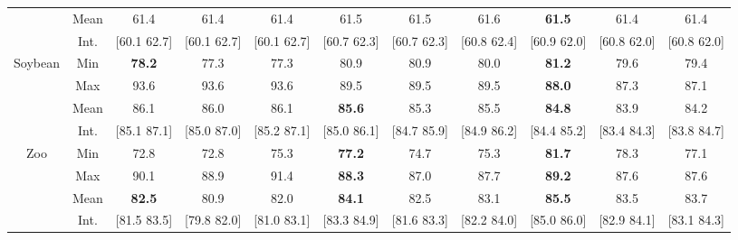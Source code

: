 \documentclass[10pt]{article}
\begin{document}
\begin{table*}
{\begin{tabular}{|c|c|ccc|ccc|ccc|}
\\
&Mean
 &61.4 &61.4 &61.4  %
 &61.5 &61.5 &61.6  %
 &{\bfseries 61.5} &61.4 &61.4  %
\\
&Int.
 &[60.1 62.7] &[60.1 62.7] &[60.1 62.7]  %
 &[60.7 62.3] &[60.7 62.3] &[60.8 62.4]  %
 &[60.9 62.0] &[60.8 62.0] &[60.8 62.0]  %
\\
\cline{1-11}
\multirow{4}{1.6cm}{Soybean}
&Min
 &{\bfseries 78.2} &77.3 &77.3  %
 &80.9 &80.9 &80.0  %
 &{\bfseries 81.2} &79.6 &79.4  %
\\
&Max
 &93.6 &93.6 &93.6  %
 &89.5 &89.5 &89.5  %
 &{\bfseries 88.0} &87.3 &87.1  %
\\
&Mean
 &86.1 &86.0 &86.1  %
 &{\bfseries 85.6} &85.3 &85.5  %
 &{\bfseries 84.8} &83.9 &84.2  %
\\
&Int.
 &[85.1 87.1] &[85.0 87.0] &[85.2 87.1]  %
 &[85.0 86.1] &[84.7 85.9] &[84.9 86.2]  %
 &[84.4 85.2] &[83.4 84.3] &[83.8 84.7]  %
\\
\cline{1-11}
\multirow{4}{1.6cm}{Zoo}
&Min
 &72.8 &72.8 &75.3  %
 &{\bfseries 77.2} &74.7 &75.3  %
 &{\bfseries 81.7} &78.3 &77.1  %
\\
&Max
 &90.1 &88.9 &91.4  %
 &{\bfseries 88.3} &87.0 &87.7  %
 &{\bfseries 89.2} &87.6 &87.6  %
\\
&Mean
 &{\bfseries 82.5} &80.9 &82.0  %
 &{\bfseries 84.1} &82.5 &83.1  %
 &{\bfseries 85.5} &83.5 &83.7  %
\\
&Int.
 &[81.5 83.5] &[79.8 82.0] &[81.0 83.1]  %
 &[83.3 84.9] &[81.6 83.3] &[82.2 84.0]  %
 &[85.0 86.0] &[82.9 84.1] &[83.1 84.3]  %
\\
\cline{1-11}
\hline
\end{tabular}}
\end{table*}
\end{document}
